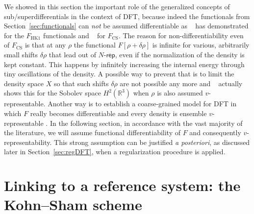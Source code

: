 \documentclass[journal=apcach,manuscript=article,layout=twocolumn]{achemso}
\newcommand{\R}{\mathbb{R}}
\newcommand{\FHK}{F_\mathrm{HK1}}
\newcommand{\FCS}{F_\mathrm{CS}}
\newcommand{\Nrep}{\ensuremath{N\text{-}\mathsf{rep}}}
\begin{document}
We showed in this section the important role of the generalized concepts of sub/super\-differentials in the context of DFT, because indeed the functionals from Section~\ref{sec:functionals} can \emph{not} be assumed differentiable as \citeauthor{vanLeuuwen2003key}~\cite{vanLeuuwen2003key} has demonstrated for the $\FHK$ functionals and \citeauthor{Lammert2007}~\cite{Lammert2007} for $\FCS$. The reason for non-differentiability even of $\FCS$ is that at any $\rho$ the functional $F[\rho + \delta\rho]$ is infinite for various, arbitrarily small shifts $\delta\rho$ that lead out of $\Nrep$, even if the normalization of the density is kept constant. This happens by infinitely increasing the internal energy through tiny oscillations of the density. A possible way to prevent that is to limit the density space $X$ so that such shifts $\delta\rho$ are not possible any more and \citeauthor{Lammert2007}~\cite{Lammert2007} actually shows this for the Sobolev space $H^2(\R^3)$ when $\rho$ is also assumed $v$-representable. Another way is to establish a coarse-grained model for DFT in which $F$ really becomes differentiable and every density is ensemble $v$-representable \cite{lammert2010-coarse-grained}. 
In the following section, in accordance with the vast majority of the literature, we will assume functional differentiability of $F$ and consequently $v$-representability. This strong assumption can be justified \textit{a posteriori}, as discussed later in Section~\ref{sec:regDFT}, when a regularization procedure is applied.

\section{Linking to a reference system: the Kohn--Sham scheme}
\label{sec:KS}
\end{document}
